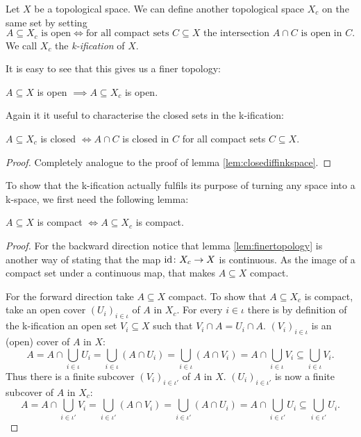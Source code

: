 \begin{defi}
    Let $X$ be a topological space. 
    We can define another topological space $X_c$ on the same set by setting
    \[A \subseteq X_c \text{ is open} \iff \text{for all compact sets } C \subseteq X \text{ the intersection } A \cap C \text{ is open in } C.\]
    We call $X_c$ the \emph{k-ification} of $X$.
\end{defi}

It is easy to see that this gives us a finer topology: 

\begin{lem}\label{lem:finertopology}
    $A \subseteq X$ is open $\implies A \subseteq X_c$ is open.
\end{lem}

Again it it useful to characterise the closed sets in the k-ification: 

\begin{lem}\label{lem:closediffinkification}
    $A \subseteq X_c$ is closed $\iff A \cap C$ is closed in $C$ for all compact sets $C \subseteq X$.
\end{lem}
\begin{proof}
    Completely analogue to the proof of lemma \ref{lem:closediffinkspace}.
\end{proof}

To show that the k-ification actually fulfils its purpose of turning any space into a k-space, we first need the following lemma:

\begin{lem}\label{lem:compactiffcompact}
    $A \subseteq X$ is compact $\iff A \subseteq X_c$ is compact.
\end{lem}
\begin{proof}
    For the backward direction notice that lemma \ref{lem:finertopology} is another way of stating that the map $\text{id} \colon X_c \to X$ is continuous. 
    As the image of a compact set under a continuous map, that makes $A \subseteq X$ compact. 

    For the forward direction take $A \subseteq X$ compact. 
    To show that $A \subseteq X_c$ is compact, take an open cover $(U_i)_{i \in \iota}$ of $A$ in $X_c$. 
    For every $i \in \iota$ there is by definition of the k-ification an open set $V_i \subseteq X$ such that $V_i \cap A = U_i \cap A$.  
    $(V_i)_{i \in \iota}$ is an (open) cover of $A$ in $X$: 
    \[A = A \cap \bigcup_{i \in \iota} U_i = \bigcup_{i \in \iota} (A \cap U_i) = \bigcup_{i \in \iota} (A \cap V_i) = A \cap \bigcup_{i \in \iota} V_i \subseteq \bigcup_{i \in \iota} V_i.\]
    Thus there is a finite subcover $(V_i)_{i \in \iota'}$ of $A$ in $X$.
    $(U_i)_{i \in \iota'}$ is now a finite subcover of $A$ in $X_c$: 
    \[A = A \cap \bigcup_{i \in \iota'} V_i = \bigcup_{i \in \iota'} (A \cap V_i) = \bigcup_{i \in \iota'} (A \cap U_i) = A \cap \bigcup_{i \in \iota'} U_i \subseteq \bigcup_{i \in \iota'} U_i.\]
\end{proof}

